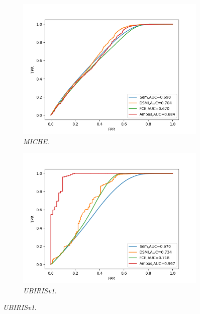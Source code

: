 \begin{figure}[H]
    \centering %
\begin{subfigure}{0.5\textwidth}
  \includegraphics[width=\linewidth]{img/Resultados/miche_inter_distortion_auc.png}
  \caption{\textit{MICHE}.}
\end{subfigure}\hfil %
\begin{subfigure}{0.5\textwidth}
  \includegraphics[width=\linewidth]{img/Resultados/ubirisv1_inter_distortion_auc.png}
  \caption{\textit{UBIRISv1}.}
\end{subfigure}


\end{figure}
